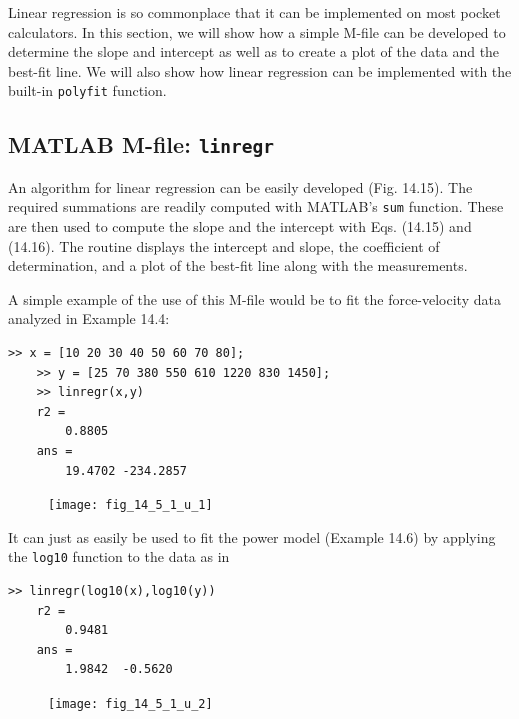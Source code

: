 \documentclass[../main.tex]{subfiles}
\begin{document}
\noindent Linear regression is so commonplace that it can be implemented on most pocket calculators. In this section, we will show how a simple M-file can be developed to determine the slope and intercept as well as to create a plot of the data and the best-fit line. We will also show how linear regression can be implemented with the built-in \texttt{polyfit} function.

\label{cha:cha_P_14_5_1}
\subsection{MATLAB M-file: \texttt{linregr}}
\noindent An algorithm for linear regression can be easily developed (Fig. 14.15). The required summations are readily computed with MATLAB's \texttt{sum} function. These are then used to compute the slope and the intercept with Eqs. (14.15) and (14.16). The routine displays the intercept and slope, the coefficient of determination, and a plot of the best-fit line along with the measurements.

A simple example of the use of this M-file would be to fit the force-velocity data analyzed in Example 14.4:

\begin{lstlisting}[numbers=none]
	>> x = [10 20 30 40 50 60 70 80];
	>> y = [25 70 380 550 610 1220 830 1450];
	>> linregr(x,y)
	r2 =
		0.8805
	ans =
		19.4702 -234.2857
\end{lstlisting}

\begin{figure}[H]
	\centering
	\texttt{[image: fig\_14\_5\_1\_u\_1]}
\end{figure}

It can just as easily be used to fit the power model (Example 14.6) by applying the
\texttt{log10} function to the data as in

\begin{lstlisting}[numbers=none]
	>> linregr(log10(x),log10(y))
	r2 =
		0.9481
	ans =
		1.9842	-0.5620
\end{lstlisting}

\begin{figure}[H]
	\centering
	\texttt{[image: fig\_14\_5\_1\_u\_2]}
\end{figure}
\end{document}
